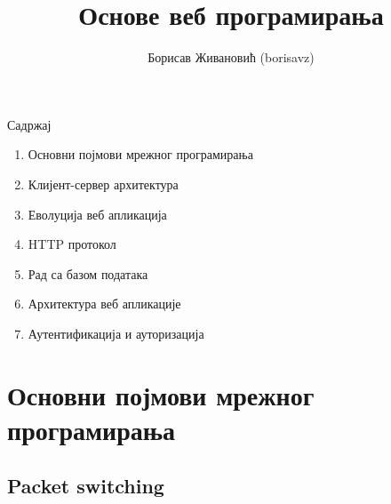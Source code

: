 \documentclass{beamer}
\title{Основе веб програмирања}
\author{Борисав Живановић (borisavz)}
\begin{document}
    \begin{frame}
        \maketitle
    \end{frame}

    \begin{frame}{Садржај}
        \begin{enumerate}
            \item Основни појмови мрежног програмирања
            \item Клијент-сервер архитектура
            \item Еволуција веб апликација
            \item HTTP протокол
            \item Рад са базом података
            \item Архитектура веб апликације
            \item Аутентификација и ауторизација
        \end{enumerate}
    \end{frame}

    \section{Основни појмови мрежног програмирања}
    \subsection{Packet switching}
\end{document}
